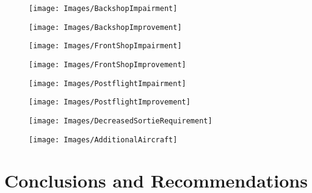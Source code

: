 \documentclass[12pt]{amsart}
\begin{document}


\begin{figure}
	\centering
	\texttt{[image: Images/BackshopImpairment]}
	\caption{}
	\label{fig:backshopimpairment}
\end{figure}
\begin{figure}
	\centering
	\texttt{[image: Images/BackshopImprovement]}
	\caption{}
	\label{fig:backshopimprovement}
\end{figure}

\begin{figure}
	\centering
	\texttt{[image: Images/FrontShopImpairment]}
	\caption{}
	\label{fig:frontshopimpairment}
\end{figure}
\begin{figure}
	\centering
	\texttt{[image: Images/FrontShopImprovement]}
	\caption{}
	\label{fig:frontshopimprovement}
\end{figure}

\begin{figure}
	\centering
	\texttt{[image: Images/PostflightImpairment]}
	\caption{}
	\label{fig:postflightimpairment}
\end{figure}
\begin{figure}
	\centering
	\texttt{[image: Images/PostflightImprovement]}
	\caption{}
	\label{fig:postflightimprovement}
\end{figure}


\begin{figure}
	\centering
	\texttt{[image: Images/DecreasedSortieRequirement]}
	\caption{}
	\label{fig:decreasedsortierequirement}
\end{figure}
\begin{figure}
	\centering
	\texttt{[image: Images/AdditionalAircraft]}
	\caption{}
	\label{fig:additionalaircraft}
\end{figure}




\section{Conclusions and Recommendations}

\end{document}
